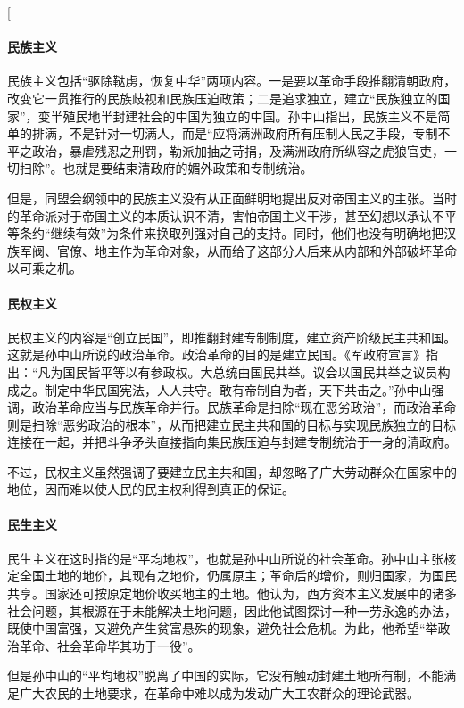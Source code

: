 \begin{enumerate}
	\question[如何评价孙中山的三民主义学说？]
	\ans[
		\paragraph{民族主义\\} 
		民族主义包括“驱除鞑虏，恢复中华”两项内容。一是要以革命手段推翻清朝政府，改变它一贯推行的民族歧视和民族压迫政策；二是追求独立，建立“民族独立的国家”，变半殖民地半封建社会的中国为独立的中国。孙中山指出，民族主义不是简单的排满，不是针对一切满人，而是“应将满洲政府所有压制人民之手段，专制不平之政治，暴虐残忍之刑罚，勒派加抽之苛捐，及满洲政府所纵容之虎狼官吏，一切扫除”。也就是要结束清政府的媚外政策和专制统治。\par
		但是，同盟会纲领中的民族主义没有从正面鲜明地提出反对帝国主义的主张。当时的革命派对于帝国主义的本质认识不清，害怕帝国主义干涉，甚至幻想以承认不平等条约“继续有效”为条件来换取列强对自己的支持。同时，他们也没有明确地把汉族军阀、官僚、地主作为革命对象，从而给了这部分人后来从内部和外部破坏革命以可乘之机。
　　\paragraph{民权主义\\} 民权主义的内容是“创立民国”，即推翻封建专制制度，建立资产阶级民主共和国。这就是孙中山所说的政治革命。政治革命的目的是建立民国。《军政府宣言》指出：“凡为国民皆平等以有参政权。大总统由国民共举。议会以国民共举之议员构成之。制定中华民国宪法，人人共守。敢有帝制自为者，天下共击之。”孙中山强调，政治革命应当与民族革命并行。民族革命是扫除“现在恶劣政治”，而政治革命则是扫除“恶劣政治的根本”，从而把建立民主共和国的目标与实现民族独立的目标连接在一起，并把斗争矛头直接指向集民族压迫与封建专制统治于一身的清政府。\par
		不过，民权主义虽然强调了要建立民主共和国，却忽略了广大劳动群众在国家中的地位，因而难以使人民的民主权利得到真正的保证。
　　\paragraph{民生主义\\} 民生主义在这时指的是“平均地权”，也就是孙中山所说的社会革命。孙中山主张核定全国土地的地价，其现有之地价，仍属原主；革命后的增价，则归国家，为国民共享。国家还可按原定地价收买地主的土地。他认为，西方资本主义发展中的诸多社会问题，其根源在于未能解决土地问题，因此他试图探讨一种一劳永逸的办法，既使中国富强，又避免产生贫富悬殊的现象，避免社会危机。为此，他希望“举政治革命、社会革命毕其功于一役”。\par
		但是孙中山的“平均地权”脱离了中国的实际，它没有触动封建土地所有制，不能满足广大农民的土地要求，在革命中难以成为发动广大工农群众的理论武器。\par

\end{enumerate}
